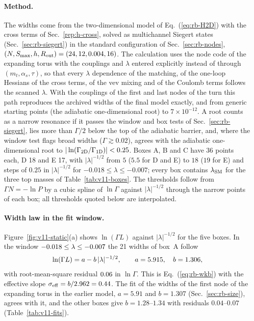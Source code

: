 \paragraph{Method.}
The widths come from the two-dimensional model of Eq.~(\ref{eq:rb-H2D}) with the cross terms of Sec.~\ref{rep:h-cross}, solved as multichannel Siegert states (Sec.~\ref{sec:rb-siegert}) in the standard configuration of Sec.~\ref{sec:rb-nodes}, $(N,S_{\max},h,R_{\rm out})=(24,12,0.004,16)$. %
The calculation uses the node code of the expanding torus with the couplings and $\lambda$ entered explicitly instead of through $(m_t,\alpha_s,\tau)$, so that every $\lambda$ dependence of the matching, of the one-loop Hessians of the cross terms, of the vev mixing and of the Coulomb terms follows the scanned $\lambda$.
With the couplings of the first and last nodes of the turn this path reproduces the archived widths of the final model exactly, and from generic starting points (the adiabatic one-dimensional root) to $7\times10^{-12}$. %
A root counts as a narrow resonance if it passes the window and box tests of Sec.~\ref{sec:rb-siegert}, lies more than $\Gamma/2$ below the top of the adiabatic barrier, and, where the window test flags broad widths ($\Gamma\gtrsim0.02$), agrees with the adiabatic one-dimensional root to $|\ln(\Gamma_{\rm 2D}/\Gamma_{\rm 1D})|<0.25$. %
Boxes A, B and C have 36 points each, D 18 and E 17, with $|\lambda|^{-1/2}$ from $5$ ($5.5$ for D and E) to $18$ ($19$ for E) and steps of $0.25$ in $|\lambda|^{-1/2}$ for $-0.018\le\lambda\le-0.007$; every box contains $\lambda_{\rm SM}$ for the three top masses of Table~\ref{tab:v11-boxes}. %
The thresholds follow from $\Gamma N=-\ln P$ by a cubic spline of $\ln\Gamma$ against $|\lambda|^{-1/2}$ through the narrow points of each box; all thresholds quoted below are interpolated.

\paragraph{Width law in the fit window.}
Figure~\ref{fig:v11-static}(a) shows $\ln(\Gamma L)$ against $|\lambda|^{-1/2}$ for the five boxes.
In the window $-0.018\le\lambda\le-0.007$ the 21 widths of box~A follow %
\begin{equation}
\ln(\Gamma L)=a-b\,|\lambda|^{-1/2},\qquad a=5.915,\quad b=1.306,
\label{eq:v11-fit}
\end{equation}
with root-mean-square residual $0.06$ in $\ln\Gamma$. %
This is Eq.~(\ref{eq:rb-wkb}) with the effective slope $\sigma_{\rm eff}=b/2.962=0.44$. %
The fit of the widths of the first node of the expanding torus in the earlier model, $a=5.91$ and $b=1.307$ (Sec.~\ref{sec:rb-size}), agrees with it, and the other boxes give $b=1.28$--$1.34$ with residuals $0.04$--$0.07$ (Table~\ref{tab:v11-fits}). %

